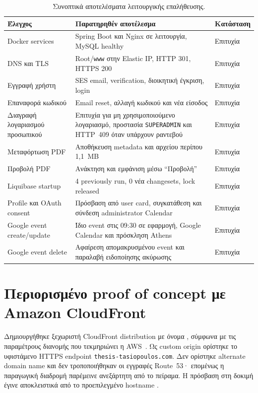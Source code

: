 \begin{table}[htbp]
\centering
\caption{Συνοπτικά αποτελέσματα λειτουργικής επαλήθευσης.}
\label{tab:functional-verification}
\small
\begin{tabularx}{\textwidth}{p{}X p{}}
\toprule
Έλεγχος & Παρατηρηθέν αποτέλεσμα & Κατάσταση \\
\midrule
Docker services & Spring Boot και Nginx σε λειτουργία, MySQL healthy & Επιτυχία \\
DNS και TLS & Root/\texttt{www} στην Elastic IP, HTTP 301, HTTPS 200 & Επιτυχία \\
Εγγραφή χρήστη & SES email, verification, διοικητική έγκριση, login & Επιτυχία \\
Επαναφορά κωδικού & Email reset, αλλαγή κωδικού και νέα είσοδος & Επιτυχία \\
Διαγραφή λογαριασμού προσωπικού & Επιτυχία για μη χρησιμοποιούμενο λογαριασμό, προστασία \texttt{SUPERADMIN} και HTTP~409 όταν υπάρχουν ραντεβού & Επιτυχία \\
Μεταφόρτωση PDF & Αποθήκευση metadata και αρχείου περίπου 1,1~MB & Επιτυχία \\
Προβολή PDF & Ανάκτηση και εμφάνιση μέσω \enquote{Προβολή} & Επιτυχία \\
Liquibase startup & 4 previously run, 0 νέα changesets, lock released & Επιτυχία \\
Profile και OAuth consent & Πρόσβαση από user card, συγκατάθεση και σύνδεση administrator Calendar & Επιτυχία \\
Google event create/update & Ίδιο event στις 09:30 σε εφαρμογή, Google Calendar και πρόσκληση Athens & Επιτυχία \\
Google event delete & Αφαίρεση απομακρυσμένου event και παραλαβή ειδοποίησης ακύρωσης & Επιτυχία \\
\bottomrule
\end{tabularx}
\end{table}

\section{Περιορισμένο proof of concept με Amazon CloudFront}
Δημιουργήθηκε ξεχωριστή CloudFront distribution με όνομα
, σύμφωνα με τις παραμέτρους διανομής που
τεκμηριώνει η AWS~\cite{aws2026cloudfront}. Ως custom origin ορίστηκε το
υφιστάμενο HTTPS endpoint \texttt{thesis-tasiopoulos.com}. Δεν ορίστηκε
alternate domain name και δεν τροποποιήθηκαν οι εγγραφές Route~53· επομένως
η παραγωγική διαδρομή παρέμεινε ανεξάρτητη από το πείραμα. Η πρόσβαση στη
δοκιμή έγινε αποκλειστικά από το προεπιλεγμένο hostname
.

